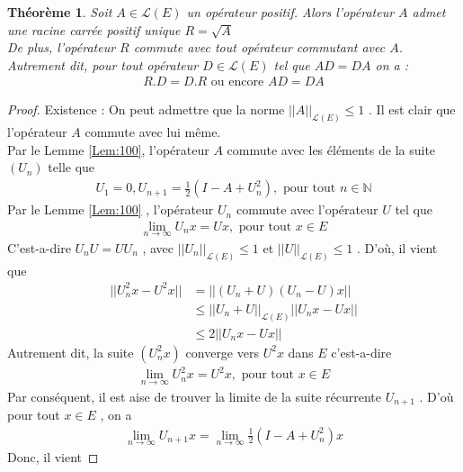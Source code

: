 \documentclass{report}
\newtheorem{The}{Théorème}[subsection]
\begin{document}
{\begin{The} \label{The:200} Soit $A \in \mathscr{L}(E)$ un opérateur positif. Alors l'opérateur $A$ admet une racine carrée positif unique $R = \sqrt{A}$ \\
De plus, l'opérateur $R$ commute avec tout opérateur commutant avec $A$.\\
Autrement dit, pour tout opérateur $D \in \mathscr{L}(E)$ tel que $AD = DA$ on a : 
									\begin{align*}
					 R.D = D.R    \,\,\text{ou encore}\,\,     A D = D A 
									\end{align*}
\end{The}
\begin{proof}
Existence : On peut admettre que la norme $||A||_{\mathscr{L}(E)} \le 1$ . Il est clair que l'opérateur $A$ commute avec lui même.\\
Par le Lemme \ref{Lem:100}, l'opérateur $A$ commute avec les éléments de la suite $(U_n)$ telle que 
									\begin{align*}
			U_1 = 0 , U_{n+1} = \frac{1}{2} (I-A+U_n^2) , \,\,\text{pour tout}\,\, n \in \mathbb{N}
									\end{align*}
Par le Lemme \ref{Lem:100} , l'opérateur $U_n$ commute avec l'opérateur $U$ tel que 
									\begin{align*}
					 \lim_{n\to \infty} U_n x = U x ,    \,\,\text{pour tout}\,\, x \in E 
									\end{align*}
C'est-a-dire $U_n U = U U_n$ , avec $||U_n||_{\mathscr{L}(E)} \le 1$ et $||U||_{\mathscr{L}(E)} \le 1$ . D'où, il vient que 
									\begin{align*}
					 ||U_n^2 x - U^2 x|| &= ||(U_n + U)(U_n - U)x|| \\
					 &\le ||U_n + U||_{\mathscr{L}(E)} ||U_n x - U x|| \\
					 &\le 2 ||U_n x - U x|| 
									\end{align*}
Autrement dit, la suite $(U_n^2 x)$ converge vers $U^2 x$ dans $E$ c'est-a-dire 
									\begin{align*}
					 \lim_{n\to \infty} U_n^2 x = U^2 x ,    \,\,\text{pour tout}\,\, x \in E 
									\end{align*}
Par conséquent, il est aise de trouver la limite de la suite récurrente $U_{n+1}$ . D'où pour tout $x \in E$ , on a 
									\begin{align*}
					 \lim_{n\to \infty} U_{n+1} x = \lim_{n\to \infty} \frac{1}{2} (I - A + U_n^2)x 
									\end{align*}
Donc, il vient 

\end{proof}}
\end{document}
